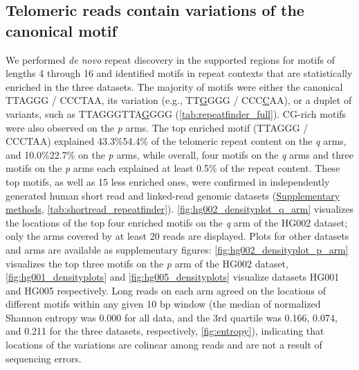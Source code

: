 \documentclass{article}
\begin{document}
\subsection*{Telomeric reads contain variations of the canonical motif}
We performed \textit{de novo} repeat discovery in the supported regions for motifs of lengths 4 through 16 and identified motifs in repeat contexts that are statistically enriched in the three datasets.
The majority of motifs were either the canonical TTAGGG / CCCTAA, its variation (e.g., TT\underline{G}GGG / CCC\underline{C}AA), or a duplet of variants, such as TTAGGGTTA\underline{G}GGG (\autoref{tab:repeatfinder_full}).
CG-rich motifs were also observed on the \textit{p} arms.
The top enriched motif (TTAGGG / CCCTAA) explained 43.3\%\textendash{}54.4\% of the telomeric repeat content on the \textit{q} arms, and 10.0\%\textendash{}22.7\% on the \textit{p} arms, while overall, four motifs on the \textit{q} arms and three motifs on the \textit{p} arms each explained at least 0.5\% of the repeat content.
These top motifs, as well as 15 less enriched ones, were confirmed in independently generated human short read and linked-read genomic datasets (\hyperref[sec:supp_methods]{Supplementary methods}, \autoref{tab:shortread_repeatfinder}).
\autoref{fig:hg002_densityplot_q_arm} visualizes the locations of the top four enriched motifs on the \textit{q} arm of the HG002 dataset; only the arms covered by at least 20 reads are displayed.
Plots for other datasets and arms are available as supplementary figures: \autoref{fig:hg002_densityplot_p_arm} visualizes the top three motifs on the \textit{p} arm of the HG002 dataset, \autoref{fig:hg001_densityplots} and \autoref{fig:hg005_densityplots} visualize datasets HG001 and HG005 respectively.
Long reads on each arm agreed on the locations of different motifs within any given 10 bp window (the median of normalized Shannon entropy was 0.000 for all data, and the 3rd quartile was 0.166, 0.074, and 0.211 for the three datasets, respectively, \autoref{fig:entropy}), indicating that locations of the variations are colinear among reads and are not a result of sequencing errors.
\end{document}
